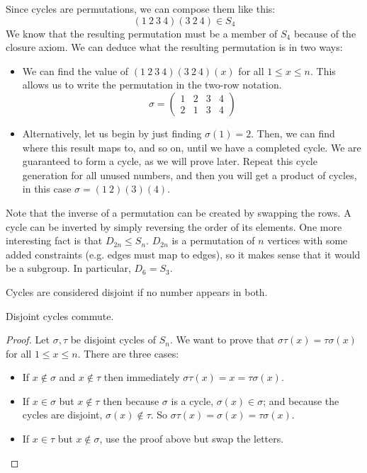 Since cycles are permutations, we can compose them like this:
\[
	(1\ 2\ 3\ 4)(3\ 2\ 4) \in S_4
\]
We know that the resulting permutation must be a member of \(S_4\) because of the closure axiom.
We can deduce what the resulting permutation is in two ways:
\begin{itemize}
	\item We can find the value of \((1\ 2\ 3\ 4)(3\ 2\ 4)(x)\) for all \(1 \leq x \leq n\).
	      This allows us to write the permutation in the two-row notation.
	      \[
		      \sigma = \begin{pmatrix}
			      1 & 2 & 3 & 4 \\
			      2 & 1 & 3 & 4
		      \end{pmatrix}
	      \]
	\item Alternatively, let us begin by just finding \(\sigma(1) = 2\).
	      Then, we can find where this result maps to, and so on, until we have a completed cycle.
	      We are guaranteed to form a cycle, as we will prove later.
	      Repeat this cycle generation for all unused numbers, and then you will get a product of cycles, in this case \(\sigma = (1\ 2)(3)(4)\).
\end{itemize}
Note that the inverse of a permutation can be created by swapping the rows.
A cycle can be inverted by simply reversing the order of its elements.
One more interesting fact is that \(D_{2n} \leq S_n\).
\(D_{2n}\) is a permutation of \(n\) vertices with some added constraints (e.g.
edges must map to edges), so it makes sense that it would be a subgroup.
In particular, \(D_6 = S_3\).

Cycles are considered disjoint if no number appears in both.
\begin{lemma}
	Disjoint cycles commute.
\end{lemma}
\begin{proof}
	Let \(\sigma, \tau\) be disjoint cycles of \(S_n\).
	We want to prove that \(\sigma\tau(x) = \tau\sigma(x)\) for all \(1 \leq x \leq n\).
	There are three cases:
	\begin{itemize}
		\item If \(x \notin \sigma\) and \(x \notin \tau\) then immediately \(\sigma\tau(x) = x = \tau\sigma(x)\).
		\item If \(x \in \sigma\) but \(x \notin \tau\) then because \(\sigma\) is a cycle, \(\sigma(x) \in \sigma\); and because the cycles are disjoint, \(\sigma(x) \notin \tau\).
		      So \(\sigma\tau(x) = \sigma(x) = \tau\sigma(x)\).
		\item If \(x \in \tau\) but \(x \notin \sigma\), use the proof above but swap the letters.
	\end{itemize}
\end{proof}

